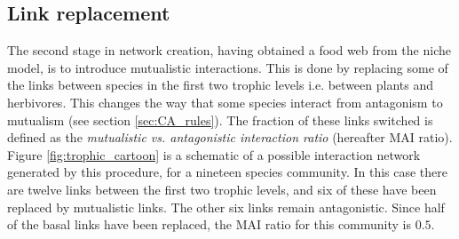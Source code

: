\subsection{Link replacement}
\label{sec:link_replacement}

The second stage in network creation, having obtained a food web from the niche model, is to introduce mutualistic interactions. This is done by replacing some of the links between species in the first two trophic levels i.e. between plants and herbivores. This changes the way that some species interact from antagonism to mutualism (see section \ref{sec:CA_rules}). The fraction of these links switched is defined as the \emph{mutualistic vs. antagonistic interaction ratio} (hereafter MAI ratio). Figure \ref{fig:trophic_cartoon} is a schematic of a possible interaction network generated by this procedure, for a nineteen species community. In this case there are twelve links between the first two trophic levels, and six of these have been replaced by mutualistic links. The other six links remain antagonistic. Since half of the basal links have been replaced, the MAI ratio for this community is $0.5$.



